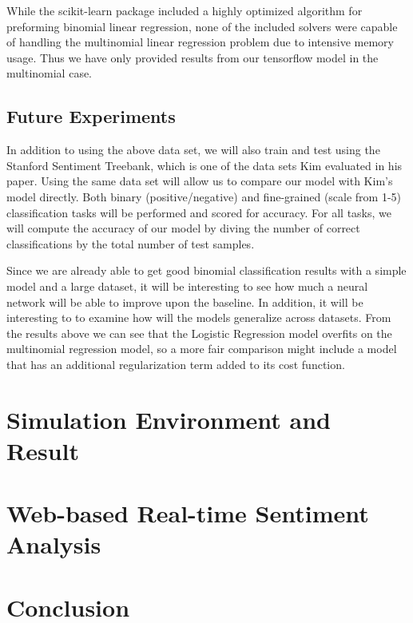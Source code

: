 \documentclass[conference]{IEEEtran}
\begin{document}
    While the scikit-learn package included a highly optimized algorithm for
    preforming binomial linear regression, none of the included solvers were
    capable of handling the multinomial linear regression problem due to intensive
    memory usage. Thus we have only provided results from our tensorflow
    model in the multinomial case.
\subsection{Future Experiments}
    In addition to using the above data set, we will also train and test using the 
    Stanford Sentiment Treebank, which is one of the data sets Kim evaluated in 
    his paper\cite{sentimenttreebank}. Using the same data set
    will allow us to compare our model with Kim's model directly. 
    Both binary (positive/negative) and fine-grained (scale from 1-5) 
    classification tasks will be performed and scored for accuracy.
    For all tasks, we will compute the accuracy of our model by diving the 
    number of correct classifications by the total number of test samples.
    
    Since we are already able to get good binomial classification results with a simple
    model and a large dataset, it will be interesting to see how much a neural network
    will be able to improve upon the baseline. In addition, it will be interesting to
    to examine how will the models generalize across datasets. From the results
    above we can see that the Logistic Regression model overfits on the multinomial
    regression model, so a more fair comparison might include a model that has
    an additional regularization term added to its cost function.
    
\section{Simulation Environment and Result}
\label{simulation}

\section{Web-based Real-time Sentiment Analysis}
\label{web}

\section{Conclusion}
\label{conclusion}
\end{document}
